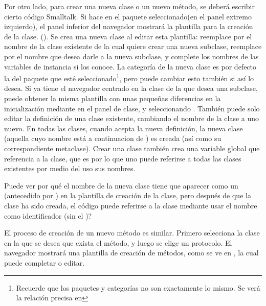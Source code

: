 \documentclass[spanish,a4paper,10pt,twoside]{book}
\begin{document}
Por otro lado, para crear una nueva clase o un nuevo m\'etodo, se deber\'a escribir
cierto c\'odigo Smalltalk. Si hace \click en el paquete
seleccionado(en el panel extremo izquierdo), el panel
inferior del navegador mostrar\'a la plantilla para la creaci\'on de la clase.
().  Se crea una nueva clase al
editar esta plantilla: reemplace  por el nombre de la clase existente
de la cual quiere crear una nueva subclase, reemplace
 por el nombre que desea darle a la nueva
subclase, y complete los nombres de las variables de instancia si los
conoce.  La categor\'ia de la nueva clase es por defecto la del paquete
que est\'e seleccionado\footnote{Recuerde que los paquetes y categor\'ias no son
exactamente lo mismo. Se ver\'a la relaci\'on precisa en }, pero puede cambiar esto tambi\'en si as\'i lo desea.  Si ya tiene el navegador centrado en la clase de la que desea una
subclase, puede obtener la misma plantilla con unas peque\~nas diferencias en la
inicializaci\'on mediante  en el panel de clase, y
seleccionando .  Tambi\'en puede solo
editar la definici\'on de una clase existente, cambiando el nombre de la clase a
uno nuevo.  En todas las clases, cuando acepta la nueva definici\'on, la
nueva clase (aquella cuyo nombre est\'a a continuacion de \ct{#}) es creada (as\'i como
su correspondiente metaclase).  Crear una clase tambi\'en crea una variable global
que referencia a la clase, que es por lo que uno puede referirse a todas las
clases existentes por medio del uso sus nombres.  

Puede ver por qu\'e el nombre de la nueva clase tiene que aparecer como un  (\ie antecedido por \ct{#}) en la plantilla de creaci\'on de la clase, pero despu\'es de que la clase ha sido creada, el c\'odigo puede referirse a la clase mediante usar el nombre como identificador (\ie sin el \ct{#})?

El proceso de creaci\'on de un nuevo m\'etodo es similar. Primero selecciona la clase en la que se desea que exista el m\'etodo, y luego se elige un protocolo.  El navegador mostrar\'a una plantilla de creaci\'on de m\'etodos, como se ve en , la cual puede completar o editar.
\end{document}
